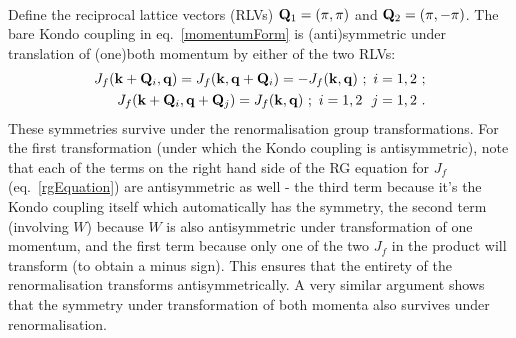 \documentclass[%
reprint,
superscriptaddress,
groupedaddress,
superscriptaddress,
onecolumn,
]{revtex4-2}
\begin{document}
\par{}\\
Define the reciprocal lattice vectors (RLVs) \({\bf Q}_1 = \left(\pi, \pi\right)\) and \({\bf Q}_2 = \left(\pi, -\pi\right)\). The bare Kondo coupling in eq.~\ref{momentumForm} is (anti)symmetric under translation of (one)both momentum by either of the two RLVs:
\begin{equation}\begin{aligned}\label{oppositeQ}
	J_f({\bf k} + {\bf Q}_i, {\bf q}) = J_f({\bf k}, {\bf q} + {\bf Q}_i) = - J_f({\bf k}, {\bf q})~;~i = 1,2~;\\
	J_f({\bf k} + {\bf Q}_i, {\bf q} + {\bf Q}_j) = J_f({\bf k}, {\bf q})~;~i=1,2~~j=1,2~.\\
\end{aligned}\end{equation}
These symmetries survive under the renormalisation group transformations. For the first transformation (under which the Kondo coupling is antisymmetric), note that each of the terms on the right hand side of the RG equation for \(J_f\) (eq.~\ref{rgEquation}) are antisymmetric as well - the third term because it's the Kondo coupling itself which automatically has the symmetry, the second term (involving \(W\)) because \(W\) is also antisymmetric under transformation of one momentum, and the first term because only one of the two \(J_f\) in the product will transform (to obtain a minus sign). This ensures that the entirety of the renormalisation transforms antisymmetrically. A very similar argument shows that the symmetry under transformation of both momenta also survives under renormalisation.\\
\end{document}
